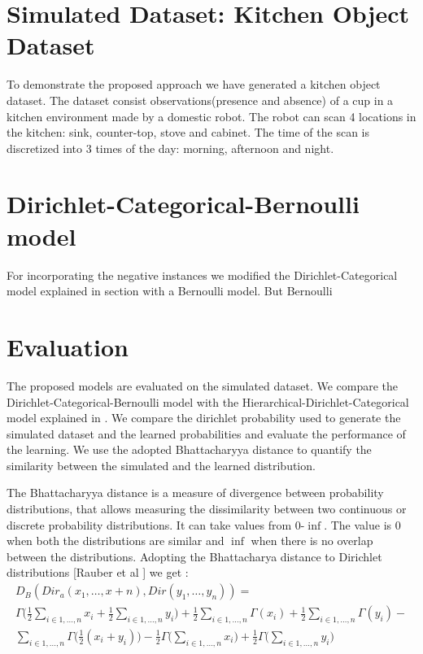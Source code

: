 \section{Simulated Dataset: Kitchen Object Dataset}

To demonstrate the proposed approach we have generated a kitchen object dataset. The dataset consist observations(presence and absence) of a cup in a kitchen environment made by a domestic robot. The robot can scan 4 locations in the kitchen: sink, counter-top, stove and cabinet. The time of the scan is discretized into 3 times of the day: morning, afternoon and night. 

\section{Dirichlet-Categorical-Bernoulli model}

For incorporating the negative instances we modified the Dirichlet-Categorical model explained in section  with a Bernoulli model. But Bernoulli 

\section{Evaluation}

The proposed models are evaluated on the simulated dataset. We compare the Dirichlet-Categorical-Bernoulli model with the Hierarchical-Dirichlet-Categorical model explained in . We compare the dirichlet probability used to generate the simulated dataset and the learned probabilities and evaluate the performance of the learning. 
We use the adopted  Bhattacharyya distance  to quantify the similarity between the simulated and the learned distribution.

 The Bhattacharyya distance is a measure of divergence between
probability distributions, that allows measuring the dissimilarity between two continuous or discrete probability distributions. It can take values from 0-$\inf$. The value is 0 when both the distributions are similar and $\inf$ when there is no overlap between the distributions. Adopting the  Bhattacharya distance to Dirichlet distributions [Rauber et al ] we get :
\begin{multline}
	D_B(Dir_a(x_1, \dots ,x+n), Dir(y_1, \dots , y_n)) = \nonumber\\
	 \Gamma \Bigg( \frac{1}{2}  \sum_{i \in {1, \dots, n}} x_i +  \frac{1}{2}\sum_{i \in {1, \dots, n}} y_i\Bigg) + 
	\frac{1}{2}  \sum_{i \in {1, \dots, n}} \Gamma (x_i) + 
	\frac{1}{2}  \sum_{i \in {1, \dots, n}} \Gamma (y_i) - \\ 
	\sum_{i \in {1, \dots, n}} \Gamma \bigg(\frac{1}{2} (x_i + y_i) \bigg) - \frac{1}{2}  \Gamma \Bigg(  \sum_{i \in {1, \dots, n}} x_i \Bigg) + \frac{1}{2}  \Gamma \Bigg( \sum_{i \in {1, \dots, n}} y_i\Bigg)
\end{multline}

